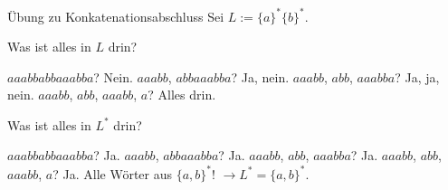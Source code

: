 \begin{frame}{Übung zu Konkatenationsabschluss}
	\pause Sei $L := \{a\}^*\{b\}^*$.
	\begin{itemize}
		\pitem Was ist alles in $L$ drin?
		\begin{itemize}
			\pitem $aaabbabbaaabba$? \pause Nein.
			\pitem $aaabb$, $abbaaabba$? \pause Ja, nein.
			\pitem $aaabb$, $abb$, $aaabba$? \pause Ja, ja, nein.
			\pitem $aaabb$, $abb$, $aaabb$, $a$? \pause Alles drin.
		\end{itemize}
		\pitem Was ist alles in $L^*$ drin?
		\begin{itemize}
			\pitem $aaabbabbaaabba$? \pause Ja.
			\pitem $aaabb$, $abbaaabba$? \pause Ja.
			\pitem $aaabb$, $abb$, $aaabba$? \pause Ja.
			\pitem $aaabb$, $abb$, $aaabb$, $a$? \pause Ja.
			\pitem Alle Wörter aus $\{a,b\}^*$! \pause $\rightarrow L^* = \{a,b\}^*$.
		\end{itemize}
	\end{itemize}
\end{frame}

